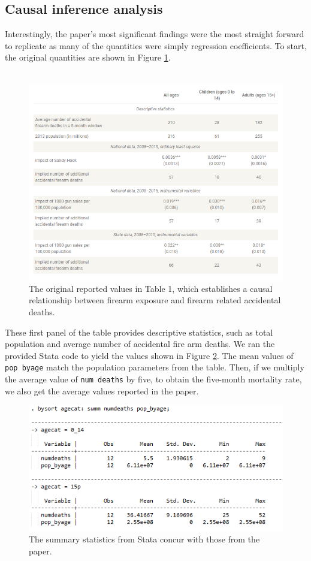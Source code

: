 \documentclass[12pt]{article}%
\begin{document}
\subsection*{Causal inference analysis}
Interestingly, the paper's most significant findings were the most straight forward to replicate as many of the quantities were simply regression coefficients. To start, the original quantities are shown in Figure \ref{fig:table_original}. \\ \\
\begin{figure}[hbt]
	\centering
	\includegraphics[width=.75\linewidth]{figures/table_original.png}
	\caption{The original reported values in Table 1, which establishes a causal relationship between firearm exposure and firearm related accidental deaths.}
	\label{fig:table_original}
\end{figure}
These first panel of the table provides descriptive statistics, such as total population and average number of accidental fire arm deaths. We ran the provided Stata code to yield the values shown in Figure \ref{fig:panel1}. The mean values of \texttt{pop byage} match the population parameters from the table. Then, if we multiply the average value of \texttt{num deaths} by five, to obtain the five-month mortality rate, we also get the average values reported in the paper.
\begin{figure}[hbt]
	\centering
	\includegraphics[width=.7\linewidth]{figures/panel1.png}
	\caption{The summary statistics from Stata concur with those from the paper.}
	\label{fig:panel1}
\end{figure}
\end{document}
